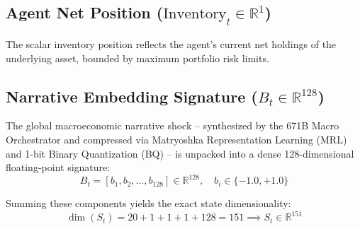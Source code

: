 \subsection{Agent Net Position ($\text{Inventory}_t \in \mathbb{R}^1$)}
The scalar inventory position reflects the agent's current net holdings of the underlying asset, bounded by maximum portfolio risk limits.

\subsection{Narrative Embedding Signature ($B_t \in \mathbb{R}^{128}$)}
The global macroeconomic narrative shock -- synthesized by the 671B Macro Orchestrator and compressed via Matryoshka Representation Learning (MRL) and 1-bit Binary Quantization (BQ) -- is unpacked into a dense 128-dimensional floating-point signature:
\begin{equation}
    B_t = [b_1, b_2, \dots, b_{128}] \in \mathbb{R}^{128}, \quad b_i \in \{-1.0, +1.0\}
\end{equation}

\noindent Summing these components yields the exact state dimensionality:
\begin{equation}
    \dim(S_t) = 20 + 1 + 1 + 1 + 128 = 151 \implies S_t \in \mathbb{R}^{151}
\end{equation}

